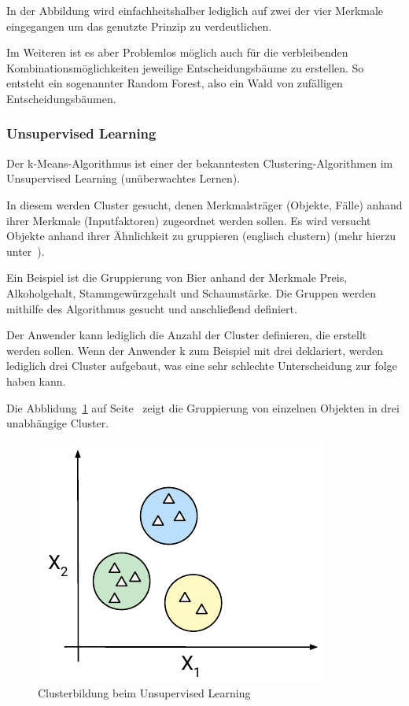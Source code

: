 In der Abbildung wird einfachheitshalber lediglich auf zwei der vier Merkmale eingegangen um das genutzte Prinzip zu
verdeutlichen.

Im Weiteren ist es aber Problemlos möglich auch für die verbleibenden Kombinationsmöglichkeiten jeweilige
Entscheidungsbäume zu erstellen. So entsteht ein sogenannter Random Forest, also ein Wald von zufälligen
Entscheidungsbäumen.

\subsubsection{Unsupervised Learning}
Der k-Means-Algorithmus ist einer der bekanntesten Clustering-Algorithmen im Unsupervised Learning (unüberwachtes
Lernen).

In diesem werden Cluster gesucht, denen Merkmalsträger (Objekte, Fälle) anhand ihrer Merkmale (Inputfaktoren)
zugeordnet werden sollen. Es wird versucht Objekte anhand ihrer Ähnlichkeit zu gruppieren (englisch clustern) (mehr
hierzu unter~\cite{book_grundlagen_learnings}).

Ein Beispiel ist die Gruppierung von Bier anhand der Merkmale Preis, Alkoholgehalt, Stammgewürzgehalt und Schaumstärke.
Die Gruppen werden mithilfe des Algorithmus gesucht und anschließend definiert.

Der Anwender kann lediglich die Anzahl der Cluster definieren, die erstellt werden sollen. Wenn der Anwender k zum
Beispiel mit drei deklariert, werden lediglich drei Cluster aufgebaut, was eine sehr schlechte Unterscheidung zur folge
haben kann.

Die Abblidung~\ref{fig:grundlagen_unsupervised_learning} auf Seite~\pageref{fig:grundlagen_unsupervised_learning} zeigt
die Gruppierung von einzelnen Objekten in drei unabhängige Cluster.

\begin{figure}[h]
    \centering
    \includegraphics[scale=1.2]{images/kapitel_2/unsupervised_learning.pdf}
    \caption{Clusterbildung beim Unsupervised Learning}
    \label{fig:grundlagen_unsupervised_learning}
\end{figure}

